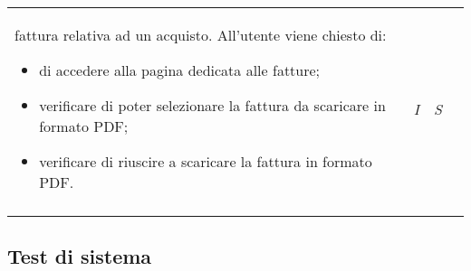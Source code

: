 \begin{longtable}{ >{\centering}p{} >{}p{}
			>{\centering}p{} >{\centering}p{}}
		 fattura relativa ad un acquisto. All'utente viene chiesto di:
		 \begin{itemize}
		 	\item di accedere alla pagina dedicata alle fatture;
		 	\item verificare di poter selezionare la fattura da scaricare in formato PDF;
		 	\item verificare di riuscire a scaricare la fattura in formato PDF.
		 \end{itemize} & \textit{I} & \textit{S}\\ \tabularnewline
\end{longtable}

\subsection{Test di sistema}
	\renewcommand{\arraystretch}{1.5}
	
